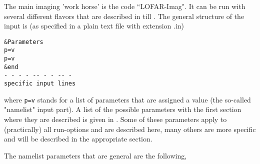 The main imaging 'work horse' is the code ``LOFAR-Imag". It can be run with several different flavors that are described in  till . The general structure of the  input is (as specified in a plain text file with extension .in)
\begin{linenumbers}
\resetlinenumber
\begin{verbatim}
&Parameters
p=v
p=v
&end
- - - - -- - - -- -
specific input lines
\end{verbatim}
\end{linenumbers}

where  \verb!p=v! stands for a list of parameters that are assigned a value (the so-called "namelist" input part). A list of the possible parameters with the first section where they are described is given in . Some of these parameters apply to (practically) all run-options and are described here, many others are more specific and will be described in the appropriate section.

The namelist parameters that are general are the following,

